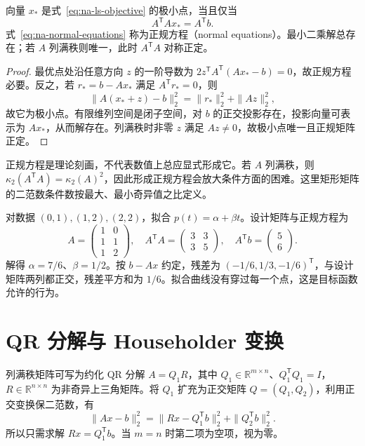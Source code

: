 \documentclass[UTF8,12pt,a4paper,fontset=fandol]{ctexbook}
\begin{document}
\begin{theorem}[正规方程与唯一性]
\label{thm:na-normal-equations}
向量 $x_*$ 是式~\eqref{eq:na-ls-objective} 的极小点，当且仅当
\begin{equation}
 A^{\mathsf T}Ax_*=A^{\mathsf T}b.
 \label{eq:na-normal-equations}
\end{equation}
式~\eqref{eq:na-normal-equations} 称为正规方程（normal equations）。最小二乘解总存在；若 $A$ 列满秩则唯一，此时 $A^{\mathsf T}A$ 对称正定。
\end{theorem}
\begin{proof}
最优点处沿任意方向 $z$ 的一阶导数为 $2z^{\mathsf T}A^{\mathsf T}(Ax_*-b)=0$，故正规方程必要。反之，若 $r_*=b-Ax_*$ 满足 $A^{\mathsf T}r_*=0$，则
\[
 \|A(x_*+z)-b\|_2^2=\|r_*\|_2^2+\|Az\|_2^2,
\]
故它为极小点。有限维列空间是闭子空间，对 $b$ 的正交投影存在，投影向量可表示为 $Ax_*$，从而解存在。列满秩时非零 $z$ 满足 $Az\ne0$，故极小点唯一且正规矩阵正定。
\end{proof}

正规方程是理论刻画，不代表数值上总应显式形成它。若 $A$ 列满秩，则 $\kappa_2(A^{\mathsf T}A)=\kappa_2(A)^2$，因此形成正规方程会放大条件方面的困难。这里矩形矩阵的二范数条件数按最大、最小奇异值之比定义。

\begin{example}[直线拟合]
对数据 $(0,1),(1,2),(2,2)$，拟合 $p(t)=\alpha+\beta t$。设计矩阵与正规方程为
\[
 A=\begin{pmatrix}1&0\\1&1\\1&2\end{pmatrix},\quad
 A^{\mathsf T}A=\begin{pmatrix}3&3\\3&5\end{pmatrix},\quad
 A^{\mathsf T}b=\begin{pmatrix}5\\6\end{pmatrix}.
\]
解得 $\alpha=7/6$、$\beta=1/2$。按 $b-Ax$ 约定，残差为 $(-1/6,1/3,-1/6)^{\mathsf T}$，与设计矩阵两列都正交，残差平方和为 $1/6$。拟合曲线没有穿过每一个点，这是目标函数允许的行为。
\end{example}

\section{QR 分解与 Householder 变换}
列满秩矩阵可写为约化 QR 分解 $A=Q_1R$，其中 $Q_1\in\mathbb R^{m\times n}$、$Q_1^{\mathsf T}Q_1=I$，$R\in\mathbb R^{n\times n}$ 为非奇异上三角矩阵。将 $Q_1$ 扩充为正交矩阵 $Q=(Q_1,Q_2)$，利用正交变换保二范数，有
\[
 \|Ax-b\|_2^2=\|Rx-Q_1^{\mathsf T}b\|_2^2+\|Q_2^{\mathsf T}b\|_2^2.
\]
所以只需求解 $Rx=Q_1^{\mathsf T}b$。当 $m=n$ 时第二项为空项，视为零。
\end{document}
